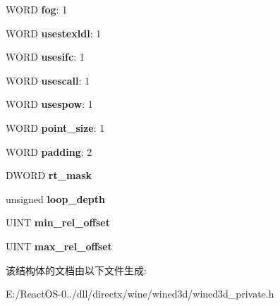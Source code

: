 \begin{DoxyCompactItemize}
\item 
\mbox{\label{structwined3d__shader__reg__maps_a0a1c24c9b9d8acfac6d5035e231c5309}} 
W\+O\+RD {\bfseries fog}\+: 1
\item 
\mbox{\label{structwined3d__shader__reg__maps_a08c210c55b6fac3506720906e3fc01db}} 
W\+O\+RD {\bfseries usestexldl}\+: 1
\item 
\mbox{\label{structwined3d__shader__reg__maps_a9182e2c65111c26d6996643c7881295a}} 
W\+O\+RD {\bfseries usesifc}\+: 1
\item 
\mbox{\label{structwined3d__shader__reg__maps_a2f113841b213f829fb33af4aa2fe4b82}} 
W\+O\+RD {\bfseries usescall}\+: 1
\item 
\mbox{\label{structwined3d__shader__reg__maps_aa5f610d663b75fa038e595ce1ad761b2}} 
W\+O\+RD {\bfseries usespow}\+: 1
\item 
\mbox{\label{structwined3d__shader__reg__maps_ae66b90a744184b6de2501cd7138ba323}} 
W\+O\+RD {\bfseries point\+\_\+size}\+: 1
\item 
\mbox{\label{structwined3d__shader__reg__maps_a125a7c2efb3895dceb8ad1c29d4f5bc2}} 
W\+O\+RD {\bfseries padding}\+: 2
\item 
\mbox{\label{structwined3d__shader__reg__maps_a1860a3ea3d0c3308e35753221871ca75}} 
D\+W\+O\+RD {\bfseries rt\+\_\+mask}
\item 
\mbox{\label{structwined3d__shader__reg__maps_a353c1bc808b0a2ad978e269d7a78f8dd}} 
unsigned {\bfseries loop\+\_\+depth}
\item 
\mbox{\label{structwined3d__shader__reg__maps_a125cfac95aedb3724f254a7ce89d1161}} 
U\+I\+NT {\bfseries min\+\_\+rel\+\_\+offset}
\item 
\mbox{\label{structwined3d__shader__reg__maps_a916b9baa2f2f66f0ca3a8d342438b6db}} 
U\+I\+NT {\bfseries max\+\_\+rel\+\_\+offset}
\end{DoxyCompactItemize}


该结构体的文档由以下文件生成\+:\begin{DoxyCompactItemize}
\item 
E\+:/\+React\+O\+S-\/0../dll/directx/wine/wined3d/wined3d\+\_\+private.\+h\end{DoxyCompactItemize}
